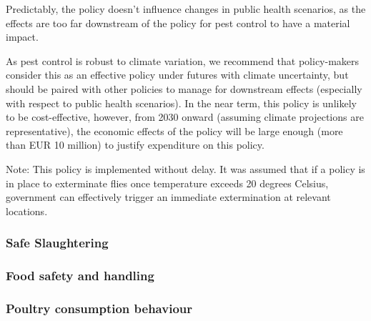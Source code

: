 Predictably, the policy doesn't influence changes in public health scenarios, as the effects are too far downstream of the policy for pest control to have a material impact.

As pest control is robust to climate variation, we recommend that policy-makers consider this as an effective policy under futures with climate uncertainty, but should be paired with other policies to manage for downstream effects (especially with respect to public health scenarios). In the near term, this policy is unlikely to be cost-effective, however, from 2030 onward (assuming climate projections are representative), the economic effects of the policy will be large enough (more than EUR 10 million) to justify expenditure on this policy.

Note: This policy is implemented without delay. It was assumed that if a policy is in place to exterminate flies once temperature exceeds 20 degrees Celsius, government can effectively trigger an immediate extermination at relevant locations.

\subsubsection{Safe Slaughtering}
\label{sec: safe slaughtering}


\subsubsection{Food safety and handling}
\label{sec: food safety}

\subsubsection{Poultry consumption behaviour}
\label{sec: consumption behaviour}
